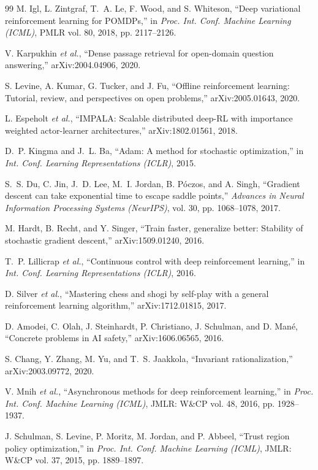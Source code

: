 \documentclass[conference]{IEEEtran}
\begin{document}
\begin{thebibliography}{99}
 M. Igl, L. Zintgraf, T.~A. Le, F. Wood, and S. Whiteson, ``Deep variational reinforcement learning for POMDPs,'' in \emph{Proc. Int. Conf. Machine Learning (ICML)}, PMLR vol. 80, 2018, pp. 2117--2126.

 V. Karpukhin \emph{et al.}, ``Dense passage retrieval for open-domain question answering,'' arXiv:2004.04906, 2020.

 S. Levine, A. Kumar, G. Tucker, and J. Fu, ``Offline reinforcement learning: Tutorial, review, and perspectives on open problems,'' arXiv:2005.01643, 2020.

 L. Espeholt \emph{et al.}, ``IMPALA: Scalable distributed deep-RL with importance weighted actor-learner architectures,'' arXiv:1802.01561, 2018.

 D.~P. Kingma and J.~L. Ba, ``Adam: A method for stochastic optimization,'' in \emph{Int. Conf. Learning Representations (ICLR)}, 2015.

 S.~S. Du, C. Jin, J.~D. Lee, M.~I. Jordan, B. P{\'o}czos, and A. Singh, ``Gradient descent can take exponential time to escape saddle points,'' \emph{Advances in Neural Information Processing Systems (NeurIPS)}, vol. 30, pp. 1068--1078, 2017.

 M. Hardt, B. Recht, and Y. Singer, ``Train faster, generalize better: Stability of stochastic gradient descent,'' arXiv:1509.01240, 2016.

 T.~P. Lillicrap \emph{et al.}, ``Continuous control with deep reinforcement learning,'' in \emph{Int. Conf. Learning Representations (ICLR)}, 2016.

 D. Silver \emph{et al.}, ``Mastering chess and shogi by self-play with a general reinforcement learning algorithm,'' arXiv:1712.01815, 2017.

 D. Amodei, C. Olah, J. Steinhardt, P. Christiano, J. Schulman, and D. Man\'e, ``Concrete problems in AI safety,'' arXiv:1606.06565, 2016.

 S. Chang, Y. Zhang, M. Yu, and T.~S. Jaakkola, ``Invariant rationalization,'' arXiv:2003.09772, 2020.

 V. Mnih \emph{et al.}, ``Asynchronous methods for deep reinforcement learning,'' in \emph{Proc. Int. Conf. Machine Learning (ICML)}, JMLR: W\&CP vol. 48, 2016, pp. 1928--1937.

 J. Schulman, S. Levine, P. Moritz, M. Jordan, and P. Abbeel, ``Trust region policy optimization,'' in \emph{Proc. Int. Conf. Machine Learning (ICML)}, JMLR: W\&CP vol. 37, 2015, pp. 1889--1897.

\end{thebibliography}
\end{document}

